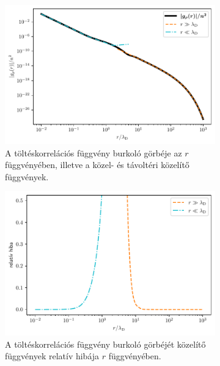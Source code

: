 \documentclass[a4paper,12pt,titlepage]{article}
\begin{document}
\begin{figure}[H]
	\centering
	\begin{subfigure}[t]{0.48\linewidth}
		\centering
		\includegraphics[width=\linewidth]{rho.pdf}
		\caption{\centering A töltéskorrelációs függvény burkoló görbéje az $r$ függvényében, illetve a közel- \newline és távoltéri közelítő függvények.}
	\end{subfigure}%
	\begin{subfigure}[t]{0.48\linewidth}
		\centering
		\includegraphics[width=0.96\linewidth]{rho_error.pdf}
		\caption{\centering A töltéskorrelációs függvény burkoló görbéjét közelítő függvények relatív hibája \newline $r$ függvényében.}
	\end{subfigure}
	\caption{}
	\label{rho-fig}
\end{figure}
\end{document}
